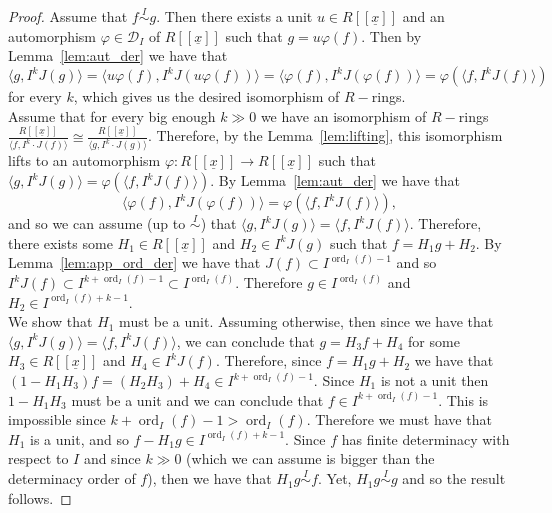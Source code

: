\documentclass{article}
\DeclareMathOperator{\ord}{ord}
\newcommand{\equivd}{\overset{I}{\sim}}
\numberwithin{theorem}{section}
\begin{document}
\begin{proof}
    Assume that $f \equivd g$. Then there exists a unit $u \in R[[\underline{x}]]$ and an automorphism $\varphi \in \mathcal{D}_I$ of $R[[\underline{x}]]$ such that $g=u \varphi(f)$. Then by Lemma~\ref{lem:aut_der} we have that 
    \begin{equation*}
        \langle g, I^k J(g) \rangle = \langle u \varphi(f), I^k J\left(u \varphi(f)\right) \rangle = \langle \varphi(f), I^k J\left(\varphi(f)\right) \rangle = \varphi\left(\langle f, I^k J(f) \rangle\right)
    \end{equation*}
%    
    for every $k$, which gives us the desired isomorphism of $R-$rings. \\

    Assume that for every big enough $k\gg 0$ we have an isomorphism  of $R-$rings $\frac{R[[\underline{x}]]}{\langle f, I^k\cdot  J(f) \rangle} \cong \frac{R[[\underline{x}]]}{\langle g, I^k\cdot  J(g)\rangle}$. Therefore, by the Lemma~\ref{lem:lifting}, this isomorphism lifts to an automorphism $\varphi \colon R[[\underline{x}]] \to R[[\underline{x}]]$ such that $\langle g, I^k J(g) \rangle= \varphi\left(\langle f, I^k J(f) \rangle\right)$. By Lemma~\ref{lem:aut_der} we have that 
    \begin{equation*}
        \langle \varphi(f), I^k J\left(\varphi(f)\right) \rangle = \varphi\left(\langle f, I^k J(f) \rangle\right),
    \end{equation*}
    and so we can assume (up to $\equivd$) that $\langle g, I^k J(g) \rangle= \langle f, I^k J(f) \rangle$. Therefore, there exists some $H_1 \in R[[\underline{x}]]$ and $H_2 \in I^k J(g)$ such that $f  = H_1g + H_2$. By Lemma~\ref{lem:app_ord_der} we have that $J(f) \subset I^{\ord_I\left(f\right)-1}$ and so $I^k J(f) \subset I^{k+\ord_I\left(f\right)-1} \subset I^{\ord_I\left(f\right)}$. Therefore $g \in I^{\ord_I\left(f\right)}$ and $H_2 \in I^{\ord_I\left(f\right) + k-1}$. \\

    We show that $H_1$ must be a unit. Assuming otherwise, then since we have that $\langle g, I^k J(g) \rangle= \langle f, I^k J(f) \rangle$, we can conclude that $g=H_3 f + H_4$ for some $H_3 \in R[[\underline{x}]]$ and $H_4 \in I^k J(f)$. Therefore, since $f=H_1g+H_2$ we have that $\left(1- H_1 H_3\right) f = \left(H_2 H_3\right)+H_4 \in I^{k+\ord_I\left(f\right)-1}$. Since $H_1$ is not a unit then $1- H_1 H_3$ must be a unit and we can conclude that $f \in I^{k+\ord_I\left(f\right)-1}$. This is impossible since $k+\ord_I\left(f\right)-1 > \ord_I\left(f\right)$. Therefore we must have that $H_1$ is a unit, and so $f - H_1 g \in I^{\ord_I\left(f\right)+k-1}$. Since $f$ has finite determinacy with respect to $I$ and since $k\gg 0$ (which we can assume is bigger than the determinacy order of $f$), then we have that $H_1 g \equivd f$. Yet, $H_1 g \equivd g$ and so the result follows. 
\end{proof}
\end{document}
